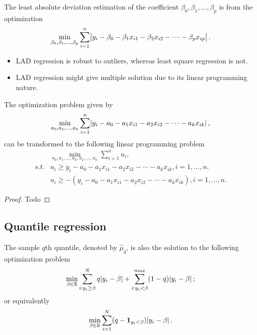 \begin{refsection}
\begin{definition}
	The least absolute deviation estimation of the coefficient $\beta_0,\beta_1,...,\beta_p$ is from the optimization
	$$\min_{\beta_0,\beta_1,...,\beta_p} \sum_{i=1}^{n} \abs{y_i - \beta_0 - \beta_1 x_{i1} - \beta_2 x_{i2} - \cdots -\beta_p x_{ip}}.$$
\end{definition}

\begin{remark}\hfill
\begin{itemize}
	\item LAD regression is robust to outliers, whereas least square regression is not.
	\item LAD regression might give multiple solution due to its linear programming nature.
\end{itemize}	
\end{remark}


\begin{lemma}
The optimization problem given by
$$\min_{a_0,a_1,...,a_k} \sum_{i=1}^{n} \abs{y_i - a_0 - a_1 x_{i1} - a_2 x_{i2} - \cdots -a_k x_{ik}},$$
can be transformed to the following linear programming problem
\begin{align*}
&\min_{a_0,a_1,...,a_k, u_1,...,u_n} \sum_{i=1}^{n} u_i ,\\
s.t. & u_i \geq y_i - a_0 -a_1x_{i1} -a_2x_{i2} - \cdots -a_kx_{ik}, i=1,...,n. \\
& u_i \geq -(y_i - a_0 -a_1x_{i1} -a_2x_{i2} - \cdots -a_kx_{ik}), i=1,...,n. 
\end{align*}
\end{lemma}
\begin{proof}
Todo
\end{proof}


\subsection{Quantile regression}

\begin{lemma}\cite[87]{cameron2005microeconometrics} 
The sample $q$th quantile, denoted by $\hat{\mu}_q$, is also the solution to the following optimization problem
$$\min_{\beta \in \mathbb{R}} \sum_{i:y_i\geq \beta}^{N} q\abs{y_i-\beta} + \sum_{i:y_i < \beta}^{max}(1-q)\abs{y_i-\beta};$$
or equivalently
$$\min_{\beta \in \mathbb{R}} \sum_{i=1}^{N} (q-\bm{1}_{y_i<\beta})\abs{y_i-\beta}.$$


\end{lemma}
\end{refsection}
